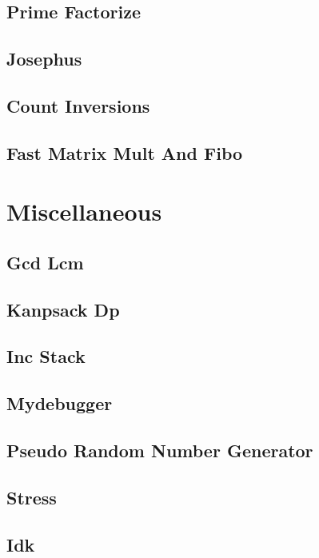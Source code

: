 \subsection{Prime Factorize}
\raggedbottom
\hrulefill
\subsection{Josephus}
\raggedbottom
\hrulefill
\subsection{Count Inversions}
\raggedbottom
\hrulefill
\subsection{Fast Matrix Mult And Fibo}
\raggedbottom
\hrulefill

\section{Miscellaneous}
\subsection{Gcd Lcm}
\raggedbottom
\hrulefill
\subsection{Kanpsack Dp}
\raggedbottom
\hrulefill
\subsection{Inc Stack}
\raggedbottom
\hrulefill
\subsection{Mydebugger}
\raggedbottom
\hrulefill
\subsection{Pseudo Random Number Generator}
\raggedbottom
\hrulefill
\subsection{Stress}
\raggedbottom
\hrulefill
\subsection{Idk}
\raggedbottom 
\hrulefill

